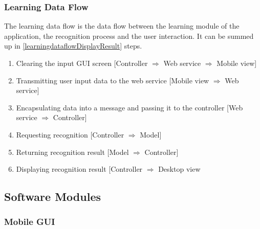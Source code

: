 \subsubsection{Learning Data Flow}
\label{sec:arch:learningdataflow}

The learning data flow is the data flow between the learning module of the 
application, the recognition process and the user interaction.
It can be summed up in \ref{learningdataflowDisplayResult} steps.
\begin{enumerate}
  \item \label{learningdataflowClear} 
        Clearing the input GUI screen 
        [Controller $\Rightarrow$ Web service $\Rightarrow$ Mobile view]
  \item \label{learningdataflowTransmit} 
        Transmitting user input data to the web service 
        [Mobile view $\Rightarrow$ Web service]
  \item \label{learningdataflowEncapsulatePass} 
        Encapsulating data into a message and passing 
        it to the controller 
        [Web service $\Rightarrow$ Controller]
  \item \label{learningdataflowRequestRecognition} 
        Requesting recognition 
        [Controller $\Rightarrow$ Model] 
  \item \label{learningdataflowReturnResult} 
        Returning recognition result 
        [Model $\Rightarrow$ Controller] 
  \item \label{learningdataflowDisplayResult} %
        Displaying recognition result 
        [Controller $\Rightarrow$ Desktop view
\end{enumerate}


\subsection{Software Modules}
\label{sec:arch:softwaremodules}

\subsubsection{Mobile GUI}
\label{sec:arch:mobilegui}


